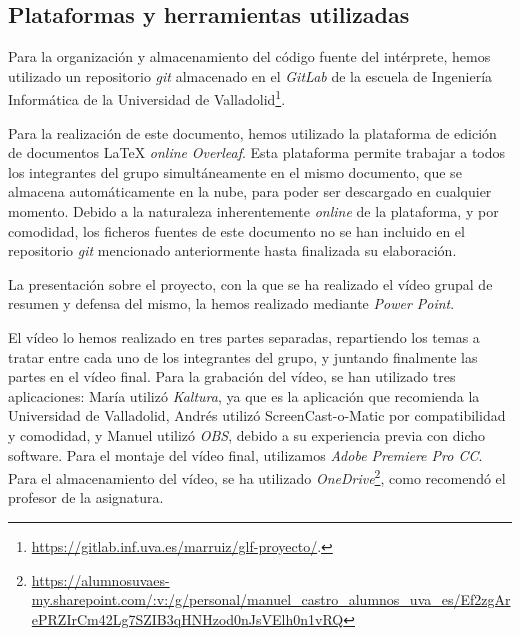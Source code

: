 \documentclass[12pt]{article}
\begin{document}
\subsection{Plataformas y herramientas utilizadas}
Para la organización y almacenamiento del código fuente del intérprete, hemos utilizado un repositorio \textit{git} almacenado en el \textit{GitLab} de la escuela de Ingeniería Informática de la Universidad de Valladolid\footnote{\url{https://gitlab.inf.uva.es/marruiz/glf-proyecto/}.}.\par
Para la realización de este documento, hemos utilizado la plataforma de edición de documentos \LaTeX{} \textit{online} \textit{Overleaf}. Esta plataforma permite trabajar a todos los integrantes del grupo simultáneamente en el mismo documento, que se almacena automáticamente en la nube, para poder ser descargado en cualquier momento. Debido a la naturaleza inherentemente \textit{online} de la plataforma, y por comodidad, los ficheros fuentes de este documento no se han incluido en el repositorio \textit{git} mencionado anteriormente hasta finalizada su elaboración.\par
La presentación sobre el proyecto, con la que se ha realizado el vídeo grupal de resumen y defensa del mismo, la hemos realizado mediante \textit{Power Point}.\par
El vídeo lo hemos realizado en tres partes separadas, repartiendo los temas a tratar entre cada uno de los integrantes del grupo, y juntando finalmente las partes en el vídeo final. Para la grabación del vídeo, se han utilizado tres aplicaciones: María utilizó \textit{Kaltura}, ya que es la aplicación que recomienda la Universidad de Valladolid, Andrés utilizó ScreenCast-o-Matic por compatibilidad y comodidad, y Manuel utilizó \textit{OBS}, debido a su experiencia previa con dicho software. Para el montaje del vídeo final, utilizamos \textit{Adobe Premiere Pro CC}. Para el almacenamiento del vídeo, se ha utilizado \textit{OneDrive}\footnote{\url{https://alumnosuvaes-my.sharepoint.com/:v:/g/personal/manuel\_castro\_alumnos\_uva\_es/Ef2zgArePRZIrCm42Lg7SZIB3qHNHzod0nJsVElh0n1vRQ}}, como recomendó el profesor de la asignatura.
\end{document}
